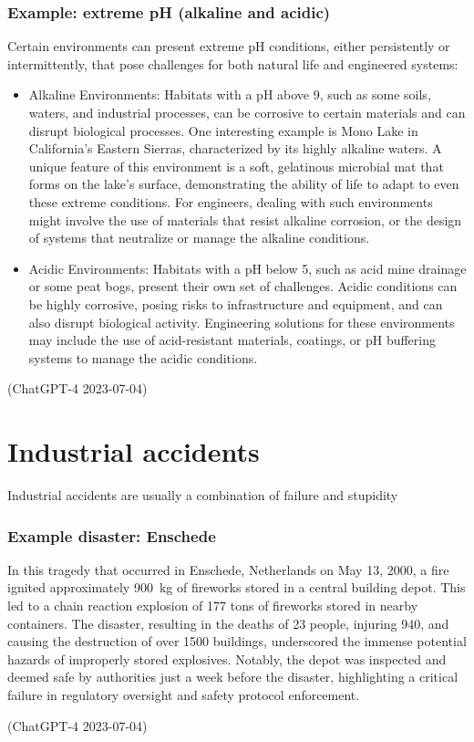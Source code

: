 \subsubsection{Example: extreme pH (alkaline and acidic)}
\begin{quoting}
    Certain environments can present extreme pH conditions, either persistently or intermittently, that pose challenges for both natural life and engineered systems:
    \begin{itemize}
        \item Alkaline Environments: Habitats with a pH above 9, such as some soils, waters, and industrial processes, can be corrosive to certain materials and can disrupt biological processes. One interesting example is Mono Lake in California's Eastern Sierras, characterized by its highly alkaline waters. A unique feature of this environment is a soft, gelatinous microbial mat that forms on the lake's surface, demonstrating the ability of life to adapt to even these extreme conditions. For engineers, dealing with such environments might involve the use of materials that resist alkaline corrosion, or the design of systems that neutralize or manage the alkaline conditions.
        \item Acidic Environments: Habitats with a pH below 5, such as acid mine drainage or some peat bogs, present their own set of challenges. Acidic conditions can be highly corrosive, posing risks to infrastructure and equipment, and can also disrupt biological activity. Engineering solutions for these environments may include the use of acid-resistant materials, coatings, or pH buffering systems to manage the acidic conditions.
    \end{itemize}

    (ChatGPT-4 2023-07-04)
\end{quoting}
\section{Industrial accidents}
Industrial accidents are usually a combination of failure and stupidity
\subsubsection{Example disaster: Enschede}
\begin{quoting}
    In this tragedy that occurred in Enschede, Netherlands on May 13, 2000, a fire ignited approximately \SI{900}{\kilo\gram} of fireworks stored in a central building depot. This led to a chain reaction explosion of 177 tons of fireworks stored in nearby containers. The disaster, resulting in the deaths of 23 people, injuring 940, and causing the destruction of over 1500 buildings, underscored the immense potential hazards of improperly stored explosives. Notably, the depot was inspected and deemed safe by authorities just a week before the disaster, highlighting a critical failure in regulatory oversight and safety protocol enforcement.

    (ChatGPT-4 2023-07-04)
\end{quoting}
